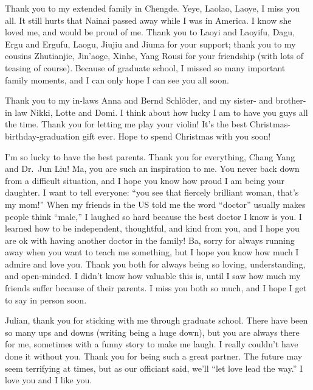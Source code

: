 Thank you to my extended family in Chengde. Yeye, Laolao, Laoye, I miss you all. It still hurts that Nainai passed away while I was in America. I know she loved me, and would be proud of me. Thank you to Laoyi and Laoyifu, Dagu, Ergu and Ergufu, Laogu, Jiujiu and Jiuma for your support; thank you to my cousins Zhutianjie, Jin'aoge, Xinhe, Yang Rousi for your friendship (with lots of teasing of course). Because of graduate school, I missed so many important family moments, and I can only hope I can see you all soon. 

Thank you to my in-laws Anna and Bernd Schl\"oder, and my sister- and brother-in law Nikki, Lotte and Domi. I think about how lucky I am to have you guys all the time. Thank you for letting me play your violin! It's the best Christmas-birthday-graduation gift ever. Hope to spend Christmas with you soon!
 
I'm so lucky to have the best parents. Thank you for everything, Chang Yang and Dr.~Jun Liu! Ma, you are such an inspiration to me. You never back down from a difficult situation, and I hope you know how proud I am being your daughter. I want to tell everyone: “you see that fiercely brilliant woman, that’s my mom!” When my friends in the US told me the word “doctor” usually makes people think ``male,'' I laughed so hard because the best doctor I know is you. I learned how to be independent, thoughtful, and kind from you, and I hope you are ok with having another doctor in the family! Ba, sorry for always running away when you want to teach me something, but I hope you know how much I admire and love you. Thank you both for always being so loving, understanding, and open-minded. I didn’t know how valuable this is, until I saw how much my friends suffer because of their parents. I miss you both so much, and I hope I get to say  in person soon.
 
Julian, thank you for sticking with me through graduate school. There have been so many ups and downs (writing being a huge down), but you are always there for me, sometimes with a funny story to make me laugh. I really couldn't have done it without you. Thank you for being such a great partner. The future may seem terrifying at times, but as our officiant said, we’ll “let love lead the way.” I love you and I like you.
 
 

